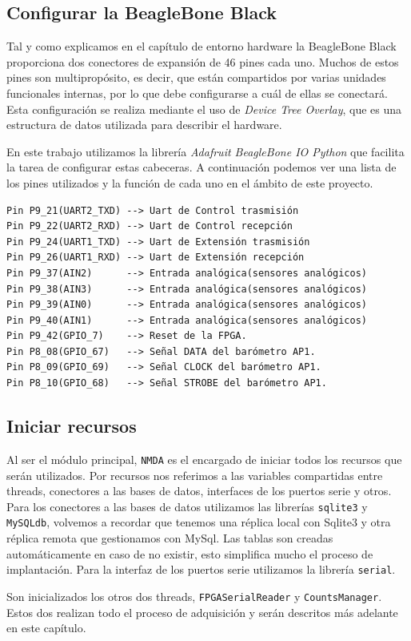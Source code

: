 	\subsection{Configurar la BeagleBone Black}
		Tal y como explicamos en el capítulo de entorno hardware la BeagleBone Black proporciona dos conectores de expansión de 46 pines cada
		uno\cite{BeagleWikiExp}. Muchos de estos pines son multipropósito, es decir, que están compartidos por varias unidades funcionales
		internas, por lo que debe configurarse a cuál de ellas se conectará. Esta configuración se realiza mediante el uso de \emph{Device
		Tree Overlay}, que es una estructura de datos utilizada para describir el hardware.
		\par
		En este trabajo utilizamos la librería \emph{Adafruit BeagleBone IO Python}\cite{AdaFruitGit} que facilita la tarea de configurar
		estas cabeceras. A continuación podemos ver una lista de los pines utilizados y la función de cada uno en el ámbito de este proyecto.
		\begin{lstlisting}[style=myBash]
Pin P9_21(UART2_TXD) --> Uart de Control trasmisión
Pin P9_22(UART2_RXD) --> Uart de Control recepción
Pin P9_24(UART1_TXD) --> Uart de Extensión trasmisión
Pin P9_26(UART1_RXD) --> Uart de Extensión recepción
Pin P9_37(AIN2)	     --> Entrada analógica(sensores analógicos)
Pin P9_38(AIN3)	     --> Entrada analógica(sensores analógicos)
Pin P9_39(AIN0)	     --> Entrada analógica(sensores analógicos)
Pin P9_40(AIN1)	     --> Entrada analógica(sensores analógicos)
Pin P9_42(GPIO_7)    --> Reset de la FPGA.
Pin P8_08(GPIO_67)   --> Señal DATA del barómetro AP1.
Pin P8_09(GPIO_69)   --> Señal CLOCK del barómetro AP1.
Pin P8_10(GPIO_68)   --> Señal STROBE del barómetro AP1.
		\end{lstlisting}

	\subsection{Iniciar recursos}
		Al ser el módulo principal, \texttt{NMDA} es el encargado de iniciar todos los recursos que serán utilizados. Por recursos nos
		referimos a las variables compartidas entre threads, conectores a las bases de datos, interfaces de los puertos serie y otros. Para
		los conectores a las bases de datos utilizamos las librerías \texttt{sqlite3} y \texttt{MySQLdb}, volvemos a recordar que tenemos una
		réplica local con Sqlite3 y otra réplica remota que gestionamos con MySql. Las tablas son creadas automáticamente en caso de no
		existir, esto simplifica mucho el proceso de implantación. Para la interfaz de los puertos serie utilizamos la librería
		\texttt{serial}.
		\par
		Son inicializados los otros dos threads, \texttt{FPGASerialReader} y \texttt{CountsManager}. Estos dos realizan todo el proceso
		de adquisición y serán descritos más adelante en este capítulo. 
